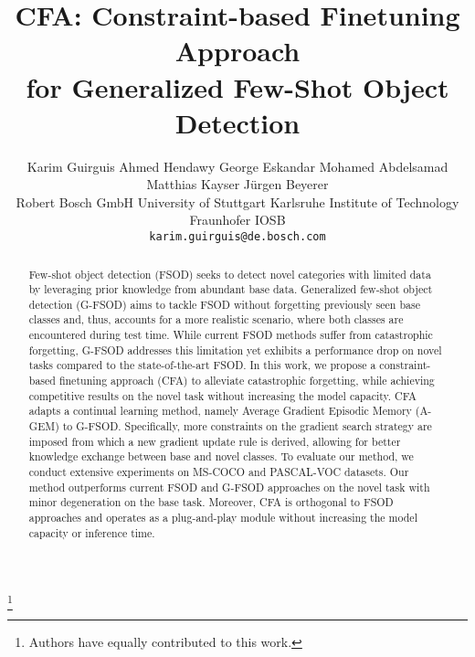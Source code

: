 \documentclass[10pt,twocolumn,letterpaper]{article}
\newcommand\blfootnote[1]{\begingroup
  \renewcommand\thefootnote{}\footnote{#1}\addtocounter{footnote}{-1}\endgroup
}
\begin{document}
\title{CFA: Constraint-based Finetuning Approach \\ for Generalized Few-Shot Object Detection}

\author{{\normalsize Karim Guirguis} \hspace{0.1em} {\normalsize Ahmed Hendawy} \hspace{0.1em}  {\normalsize George Eskandar} \hspace{0.1em}  {\normalsize Mohamed Abdelsamad} \hspace{0.1em}  {\normalsize Matthias Kayser} \hspace{0.1em}  {\normalsize J\"urgen Beyerer}\\
{\normalsize Robert Bosch GmbH} \hspace{0.2em} {\normalsize University of Stuttgart} \hspace{0.2em} {\normalsize Karlsruhe Institute of Technology} \hspace{0.2em} {\normalsize Fraunhofer IOSB} \\
{\tt\small karim.guirguis@de.bosch.com}
}
\maketitle

\begin{abstract}
Few-shot object detection (FSOD) seeks to detect novel categories with limited data by leveraging prior knowledge from abundant base data. Generalized few-shot object detection (G-FSOD) aims to tackle FSOD without forgetting previously seen base classes and, thus, accounts for a more realistic scenario, where both classes are encountered during test time. While current FSOD methods suffer from catastrophic forgetting, G-FSOD addresses this limitation yet exhibits a performance drop on novel tasks compared to the state-of-the-art FSOD. In this work, we propose a constraint-based finetuning approach (CFA) to alleviate catastrophic forgetting, while achieving competitive results on the novel task without increasing the model capacity. CFA adapts a continual learning method, namely Average Gradient Episodic Memory (A-GEM) to G-FSOD. Specifically, more constraints on the gradient search strategy are imposed from which a new gradient update rule is derived, allowing for better knowledge exchange between base and novel classes. To evaluate our method, we conduct extensive experiments on MS-COCO and PASCAL-VOC datasets. Our method outperforms current FSOD and G-FSOD approaches on the novel task with minor degeneration on the base task. Moreover, CFA is orthogonal to FSOD approaches and operates as a plug-and-play module without increasing the model capacity or inference time.
\end{abstract}
\blfootnote{ Authors have equally contributed to this work.}
\end{document}
